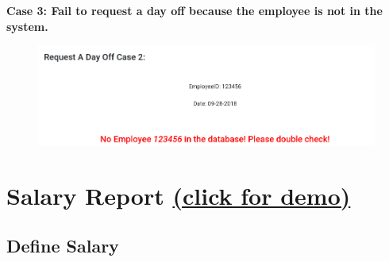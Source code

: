 \documentclass[11pt]{article}
\makeatletter
\def\maxwidth{\ifdim\Gin@nat@width>\linewidth\linewidth
    \else\Gin@nat@width\fi}
\let\Oldincludegraphics\includegraphics
\renewcommand{\includegraphics}[1]{\Oldincludegraphics[width=.8\maxwidth]{#1}}
\makeatother
\begin{document}
\noindent    \textbf{Case 3: Fail to request a day off because the employee is not in the system.}

\begin{figure}[H]
        \centering
        \includegraphics{6.png}
        \caption{}
    \end{figure}


  \section*{\texorpdfstring{Salary Report
		\href{http://cs431project-jxy225.herokuapp.com/view/salary_report_display.php}{(click for demo)}}{PHP Test Code demo link here}}\label{php-test-code-demo-link-here}
	
    \subsection*{Define Salary}\label{define-salary}
   
\end{document}
